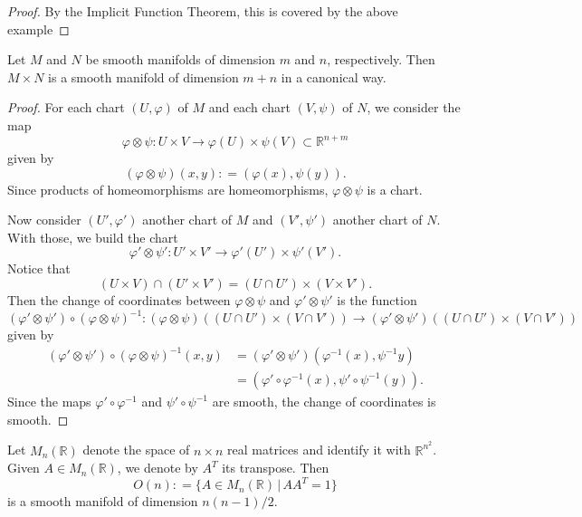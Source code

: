 \documentclass{ximera}
\begin{document}
    \begin{proof}
    By the Implicit Function Theorem, this is covered by the  above example
    \end{proof}



    \begin{example}[Products]
        Let $M$ and $N$ be smooth manifolds of dimension $m$ and $n$, respectively. Then $M \times N$ is a smooth manifold of dimension $m + n$ in a canonical way.
    \end{example}

    \begin{proof}
        For each chart $(U, \varphi)$ of $M$ and each chart $(V, \psi) $ of $N$, we consider the map
        \[    \varphi \otimes \psi : U \times V \to \varphi (U) \times \psi (V)  \subset \mathbb{R}^{n+m}       \]
        given by 
        \[  (\varphi \otimes \psi ) (x,y) : = (\varphi (x), \psi (y)). \]
        Since products of homeomorphisms are homeomorphisms, $\varphi \otimes \psi$ is a chart.  
        
        
        Now consider  $(U', \varphi ' )$ another chart of $M$ and $(V' , \psi ' ) $ another chart of $N$. With those, we build the chart
        \[      \varphi ' \otimes \psi ' : U ' \times V' \to \varphi ' (U ' ) \times \psi ' (V ' )   .        \] 
        Notice that 
        \[    (U \times V) \cap (U ' \times V' ) = (U \cap U') \times (V \times V')   .       \]
        Then the change of coordinates between $\varphi \otimes \psi $ and $\varphi ' \otimes \psi ' $ is the function 
        \[       (\varphi ' \otimes \psi ') \circ (\varphi \otimes  \psi ) ^{-1} : ( \varphi  \otimes \psi ) ( ( U \cap U ' ) \times (V \cap V') )  \to ( \varphi ' \otimes \psi ' ) ( ( U \cap U ' ) \times (V \cap V') )                    \]
        given by 
        \begin{align*}
             (\varphi ' \otimes \psi '  ) \circ (\varphi \otimes \psi ) ^{-1}  (x,y)  & = (\varphi ' \otimes \psi '  ) (\varphi ^{-1} (x) , \psi ^{-1}   y)  \\
             & =  ( \varphi ' \circ \varphi ^{-1} (x) , \psi ' \circ \psi ^{-1} (y) ) .
        \end{align*}
        Since the maps $\varphi ' \circ \varphi ^{-1}$ and $\psi ' \circ \psi ^{-1}$ are smooth, the change of coordinates is smooth.
    \end{proof}



\begin{example}
    Let $M_n (\mathbb{R})$ denote the space of $n\times n$ real matrices and identify it with $\mathbb{R}^{n^2}$. Given $A \in M_n(\mathbb{R})$, we denote by $A^T $ its transpose. Then 
    \[      O  (n ) : = \{ A \in M_n (\mathbb{R}) \, \vert \, A A^{T}  = 1 \}         \]
    is a smooth manifold of dimension $n(n-1)/2$. 
\end{example}
\end{document}
